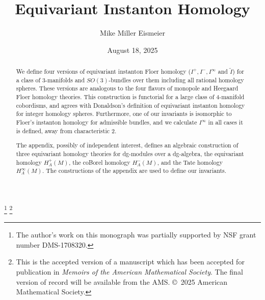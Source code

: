 \documentclass{memo-l}
\theoremstyle{definition}
\theoremstyle{remark}
\numberwithin{section}{chapter}
\numberwithin{equation}{chapter}
\begin{document}
\frontmatter

\title{Equivariant Instanton Homology}

\author{Mike Miller Eismeier}
\address{\mbox{Department of Mathematics, University of California, Los Angeles}}
\thanks{The author's work on this monograph was partially supported by NSF grant number DMS-1708320.}
\thanks{This is the accepted version of a manuscript which has been accepted for publication in \textit{Memoirs of the American Mathematical Society}. The final version of record will be available from the AMS. \copyright~2025 American Mathematical Society.}


\date{August 18, 2025}




\begin{abstract}
We define four versions of equivariant instanton Floer homology ($I^+, I^-, I^\infty$ and $\widetilde I$) for a class of 3-manifolds and $SO(3)$-bundles over them including all rational homology spheres. These versions are analogous to the four flavors of monopole and Heegaard Floer homology theories. This construction is functorial for a large class of 4-manifold cobordisms, and agrees with Donaldson's definition of equivariant instanton homology for integer homology spheres. Furthermore, one of our invariants is isomorphic to Floer's instanton homology for admissible bundles, and we calculate $I^\infty$ in all cases it is defined, away from characteristic 2.

The appendix, possibly of independent interest, defines an algebraic construction of three equivariant homology theories for dg-modules over a dg-algebra, the equivariant homology $H^+_A(M)$, the coBorel homology $H^-_A(M)$, and the Tate homology $H^\infty_A(M)$. The constructions of the appendix are used to define our invariants.
\end{abstract}
\end{document}
